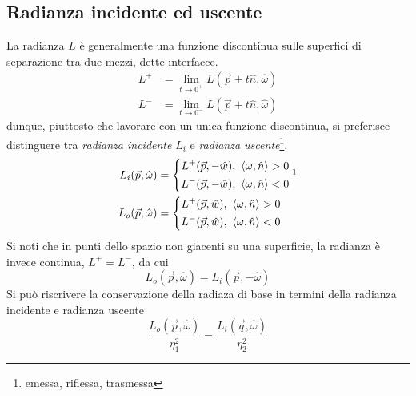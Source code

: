 \subsection{Radianza incidente ed uscente}
La radianza $L$ \`e generalmente una funzione discontinua sulle superfici di separazione tra due mezzi, dette interfacce.
\begin{align}
	L^+ &= \lim_{t\rightarrow 0^+} L(\vec{p}+t\hat{n},\hat{\omega})\\
	L^- &= \lim_{t\rightarrow 0^-} L(\vec{p}+t\hat{n},\hat{\omega})
\end{align}
dunque, piuttosto che lavorare con un unica funzione discontinua, si preferisce distinguere tra \textit{radianza incidente} $L_i$ e 
\textit{radianza uscente}\footnote{emessa, riflessa, trasmessa}.
\begin{align}
	L_i(\vec{p},\hat{\omega})&=\left\{
	\begin{aligned}
		L^+(\vec{p},-\hat{w}),\text{ }\langle\omega,\hat{n}\rangle>0\\
		L^-(\vec{p},-\hat{w}),\text{ }\langle\omega,\hat{n}\rangle<0
	\end{aligned}\right.\footnotemark{}\\
	L_o(\vec{p},\hat{\omega})&=\left\{
	\begin{aligned}
		L^+(\vec{p},\hat{w}),\text{ }\langle\omega,\hat{n}\rangle>0\\
		L^-(\vec{p},\hat{w}),\text{ }\langle\omega,\hat{n}\rangle<0
	\end{aligned}\right.
\end{align}
Si noti che in punti dello spazio non giacenti su una superficie, la radianza \`e invece continua, $L^+=L^-$, da cui
\begin{equation}
	L_o(\vec{p},\hat{\omega}) = L_i(\vec{p},-\hat{\omega})
\end{equation}
Si pu\`o riscrivere la conservazione della radiaza di base in termini della radianza incidente e radianza uscente
\begin{equation}
	\frac{L_o(\vec{p}, \hat{\omega})}{\eta^2_1} = \frac{L_i(\vec{q}, \hat{\omega})}{\eta^2_2}
\end{equation}
